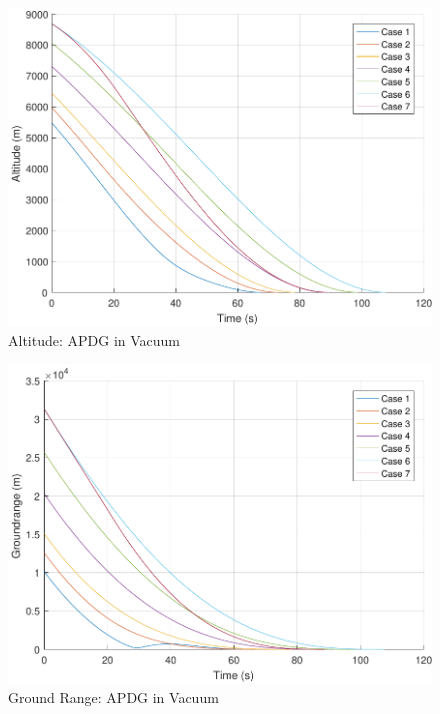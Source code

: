 \begin{figure}[H]
	\centering
	\begin{minipage}{4.5 in}
		\includegraphics[width=\linewidth]{Figures/altpowvac.pdf}
		\caption{Altitude: APDG in Vacuum \label{fig:altpowvac} }
	\end{minipage}
\end{figure}

\begin{figure}[H]
	\centering
	\begin{minipage}{4.5 in}
		\includegraphics[width=\linewidth]{Figures/rngpowvac.pdf}
		\caption{Ground Range: APDG in Vacuum \label{fig:rngpowvac} }
	\end{minipage}
\end{figure}

